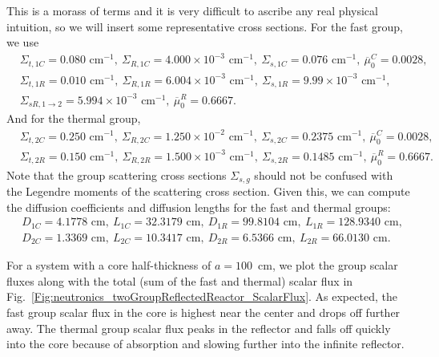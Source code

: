 This is a morass of terms and it is very difficult to ascribe any real physical intuition, so we will insert some representative cross sections. For the fast group, we use
\begin{align}
  &\Sigma_{t,1C} = 0.080\text{ cm$^{-1}$}, \ \Sigma_{R,1C} = 4.000\times 10^{-3} \text{ cm$^{-1}$}, \ \Sigma_{s,1C} = 0.076\text{ cm$^{-1}$},  \ \overline{\mu}_0^{C} = 0.0028, \nonumber \\
  &\Sigma_{t,1R} = 0.010\text{ cm$^{-1}$}, \ \Sigma_{R,1R} = 6.004\times 10^{-3} \text{ cm$^{-1}$}, \ \Sigma_{s,1R} = 9.99\times 10^{-3} \text{ cm$^{-1}$}, \nonumber \\ 
  &\Sigma_{sR,1\rightarrow 2} = 5.994\times 10^{-3} \text{ cm$^{-1}$}, \ \overline{\mu}_0^{R} = 0.6667. \nonumber 
\end{align}
And for the thermal group,
\begin{align}
  &\Sigma_{t,2C} = 0.250\text{ cm$^{-1}$}, \ \Sigma_{R,2C} = 1.250\times 10^{-2} \text{ cm$^{-1}$}, \ \Sigma_{s,2C} = 0.2375 \text{ cm$^{-1}$}, \ \overline{\mu}_0^{C} = 0.0028, \nonumber \\
  &\Sigma_{t,2R} = 0.150\text{ cm$^{-1}$}, \ \Sigma_{R,2R} = 1.500\times 10^{-3} \text{ cm$^{-1}$}, \ \Sigma_{s,2R} = 0.1485 \text{ cm$^{-1}$}, \ \overline{\mu}_0^{R} = 0.6667. \nonumber 
\end{align}
Note that the group scattering cross sections $\Sigma_{s,g}$ should not be confused with the Legendre moments of the scattering cross section. Given this, we can compute the diffusion coefficients and diffusion lengths for the fast and thermal groups:
\begin{align}
  &D_{1C} = 4.1778\text{ cm}, \ L_{1C} = 32.3179\text{ cm}, \ D_{1R} = 99.8104\text{ cm}, \ L_{1R} = 128.9340\text{ cm},  \nonumber \\
  &D_{2C} = 1.3369\text{ cm}, \ L_{2C} = 10.3417\text{ cm}, \ D_{2R} =  6.5366\text{ cm}, \ L_{2R} =  66.0130\text{ cm}.  \nonumber 
\end{align}

For a system with a core half-thickness of $a = 100$~cm, we plot the group scalar fluxes along with the total (sum of the fast and thermal) scalar flux in Fig.~\ref{Fig:neutronics_twoGroupReflectedReactor_ScalarFlux}. As expected, the fast group scalar flux in the core is highest near the center and drops off further away. The thermal group scalar flux peaks in the reflector and falls off quickly into the core because of absorption and slowing further into the infinite reflector. 

